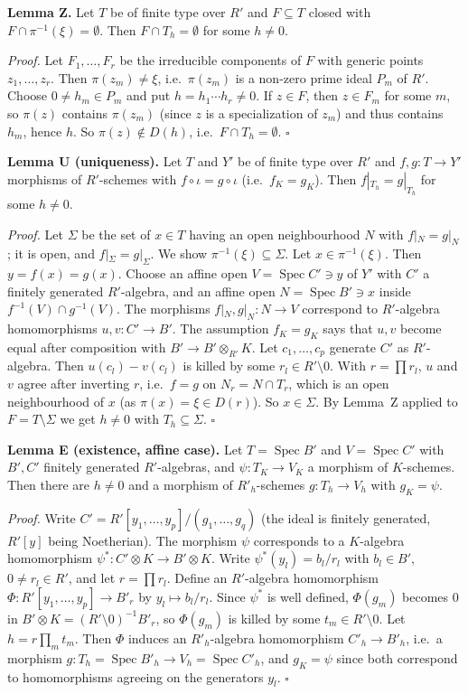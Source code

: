 \documentclass[11pt]{article}
\begin{document}
\textbf{Lemma Z.} Let $T$ be of finite type over $R'$ and $F\subseteq T$ closed with $F\cap\pi^{-1}(\xi)=\emptyset$. Then $F\cap T_h=\emptyset$ for some $h\neq0$.

\emph{Proof.} Let $F_1,\dots,F_r$ be the irreducible components of $F$ with generic points $z_1,\dots,z_r$. Then $\pi(z_m)\neq\xi$, i.e.\ $\pi(z_m)$ is a non-zero prime ideal $P_m$ of $R'$. Choose $0\neq h_m\in P_m$ and put $h=h_1\cdots h_r\neq0$. If $z\in F$, then $z\in F_m$ for some $m$, so $\pi(z)$ contains $\pi(z_m)$ (since $z$ is a specialization of $z_m$) and thus contains $h_m$, hence $h$. So $\pi(z)\notin D(h)$, i.e.\ $F\cap T_h=\emptyset$. $\square$

\textbf{Lemma U (uniqueness).} Let $T$ and $Y'$ be of finite type over $R'$ and $f,g:T\to Y'$ morphisms of $R'$-schemes with $f\circ\iota=g\circ\iota$ (i.e.\ $f_K=g_K$). Then $f|_{T_h}=g|_{T_h}$ for some $h\neq0$.

\emph{Proof.} Let $\Sigma$ be the set of $x\in T$ having an open neighbourhood $N$ with $f|_N=g|_N$; it is open, and $f|_\Sigma=g|_\Sigma$. We show $\pi^{-1}(\xi)\subseteq\Sigma$. Let $x\in\pi^{-1}(\xi)$. Then $y=f(x)=g(x)$. Choose an affine open $V=\operatorname{Spec}C'\ni y$ of $Y'$ with $C'$ a finitely generated $R'$-algebra, and an affine open $N=\operatorname{Spec}B'\ni x$ inside $f^{-1}(V)\cap g^{-1}(V)$. The morphisms $f|_N,g|_N:N\to V$ correspond to $R'$-algebra homomorphisms $u,v:C'\to B'$. The assumption $f_K=g_K$ says that $u,v$ become equal after composition with $B'\to B'\otimes_{R'}K$. Let $c_1,\dots,c_p$ generate $C'$ as $R'$-algebra. Then $u(c_l)-v(c_l)$ is killed by some $r_l\in R'\setminus0$. With $r=\prod r_l$, $u$ and $v$ agree after inverting $r$, i.e.\ $f=g$ on $N_r=N\cap T_r$, which is an open neighbourhood of $x$ (as $\pi(x)=\xi\in D(r)$). So $x\in\Sigma$. By Lemma~Z applied to $F=T\setminus\Sigma$ we get $h\neq0$ with $T_h\subseteq\Sigma$. $\square$

\textbf{Lemma E (existence, affine case).} Let $T=\operatorname{Spec}B'$ and $V=\operatorname{Spec}C'$ with $B',C'$ finitely generated $R'$-algebras, and $\psi:T_K\to V_K$ a morphism of $K$-schemes. Then there are $h\neq0$ and a morphism of $R'_h$-schemes $g:T_h\to V_h$ with $g_K=\psi$.

\emph{Proof.} Write $C'=R'[y_1,\dots,y_p]/(g_1,\dots,g_q)$ (the ideal is finitely generated, $R'[y]$ being Noetherian). The morphism $\psi$ corresponds to a $K$-algebra homomorphism $\psi^*:C'\otimes K\to B'\otimes K$. Write $\psi^*(y_l)=b_l/r_l$ with $b_l\in B'$, $0\neq r_l\in R'$, and let $r=\prod r_l$. Define an $R'$-algebra homomorphism $\Phi:R'[y_1,\dots,y_p]\to B'_r$ by $y_l\mapsto b_l/r_l$. Since $\psi^*$ is well defined, $\Phi(g_m)$ becomes $0$ in $B'\otimes K=(R'\setminus0)^{-1}B'_r$, so $\Phi(g_m)$ is killed by some $t_m\in R'\setminus0$. Let $h=r\prod_mt_m$. Then $\Phi$ induces an $R'_h$-algebra homomorphism $C'_h\to B'_h$, i.e.\ a morphism $g:T_h=\operatorname{Spec}B'_h\to V_h=\operatorname{Spec}C'_h$, and $g_K=\psi$ since both correspond to homomorphisms agreeing on the generators $y_l$. $\square$
\end{document}
